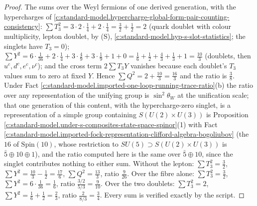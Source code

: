 \documentclass[11pt]{article}
\theoremstyle{definition}
\theoremstyle{plain}
\begin{document}
\begin{proof}
The sums over the Weyl fermions of one derived generation, with the hypercharges of \ref{c:standard-model.hypercharge-global-form-pair-counting-consistency}: $\sum T_{3}^{2} = 3 \cdot 2 \cdot \tfrac14 + 2 \cdot \tfrac14 = \tfrac32 + \tfrac12 = 2$ (quark doublet with colour multiplicity, lepton doublet, by (S), \ref{c:standard-model.hyp-s-slot-statistics}; the singlets have $T_{3} = 0$); $\sum Y^{2} = 6 \cdot \tfrac{1}{36} + 2 \cdot \tfrac14 + 3 \cdot \tfrac49 + 3 \cdot \tfrac19 + 1 + 0 = \tfrac16 + \tfrac12 + \tfrac43 + \tfrac13 + 1 = \tfrac{10}{3}$ (doublets, then $u^{c}, d^{c}, e^{c}, \nu^{c}$); and the cross term $2\sum T_{3}Y$ vanishes because each doublet's $T_{3}$ values sum to zero at fixed $Y$. Hence $\sum Q^{2} = 2 + \tfrac{10}{3} = \tfrac{16}{3}$ and the ratio is $\tfrac38$. Under Fact \ref{c:standard-model.imported-one-loop-running-trace-ratio}(b) the ratio over any representation of the unifying group is $\sin^{2}\theta_{W}$ at the unification scale; that one generation of this content, with the hypercharge-zero singlet, is a representation of a simple group containing $S(U(2) \times U(3))$ is Proposition \ref{c:standard-model.under-s-composites-state-space-spinor}(1) with Fact \ref{c:standard-model.imported-fock-representation-clifford-algebra-bogoliubov} (the $16$ of $\mathrm{Spin}(10)$, whose restriction to $SU(5) \supset S(U(2) \times U(3))$ is $\bar{5} \oplus 10 \oplus 1$), and the ratio computed here is the same over $\bar{5} \oplus 10$, since the singlet contributes nothing to either sum. Without the lepton: $\sum T_{3}^{2} = \tfrac32$, $\sum Y^{2} = \tfrac{10}{3} - \tfrac12 = \tfrac{17}{6}$, $\sum Q^{2} = \tfrac{13}{3}$, ratio $\tfrac{9}{26}$. Over the fibre alone: $\sum T_{3}^{2} = \tfrac32$, $\sum Y^{2} = 6 \cdot \tfrac{1}{36} = \tfrac16$, ratio $\tfrac{3/2}{5/3} = \tfrac{9}{10}$. Over the two doublets: $\sum T_{3}^{2} = 2$, $\sum Y^{2} = \tfrac16 + \tfrac12 = \tfrac23$, ratio $\tfrac{2}{8/3} = \tfrac34$. Every sum is verified exactly by the script.

\end{proof}
\end{document}
